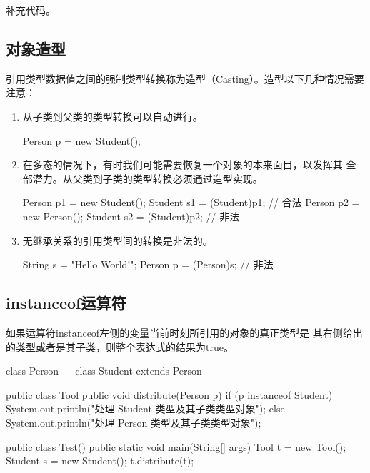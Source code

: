 补充代码。

\subsection{对象造型}

引用类型数据值之间的强制类型转换称为{\hei 造型（Casting）}。造型以下几种情况需要注意：

\begin{enumerate}
\item 从子类到父类的类型转换可以自动进行。
  \begin{javaCode}
    Person p = new Student();    
  \end{javaCode}
\item 在多态的情况下，有时我们可能需要恢复一个对象的本来面目，以发挥其
  全部潜力。从父类到子类的类型转换必须通过造型实现。
  \begin{javaCode}
    Person p1 = new Student();  
    Student s1 = (Student)p1;   // 合法
    Person p2 = new Person();   
    Student s2 = (Student)p2;  // 非法  
  \end{javaCode}
\item 无继承关系的引用类型间的转换是非法的。
  \begin{javaCode}
    String s = "Hello World!";
    Person p = (Person)s; // 非法  
  \end{javaCode}
\end{enumerate}

\subsection{instanceof运算符}

如果运算符instanceof左侧的变量当前时刻所引用的对象的{\hei\Red 真正类型}是
其右侧给出的类型{\Blue 或者是其子类}，则整个表达式的结果为true。

\begin{javaCode}
class Person { --- }
class Student extends Person { --- }

public class Tool {
  public void distribute(Person p) {
    if (p instanceof Student) {
      System.out.println("处理 Student 类型及其子类类型对象");
    } else {
      System.out.println("处理 Person 类型及其子类类型对象");
    }
  }
}
\end{javaCode}

\begin{javaCode}
public class Test() {
  public static void main(String[] args) {
    Tool t = new Tool();
    Student s = new Student();
    t.distribute(t);
  }
}
\end{javaCode}

